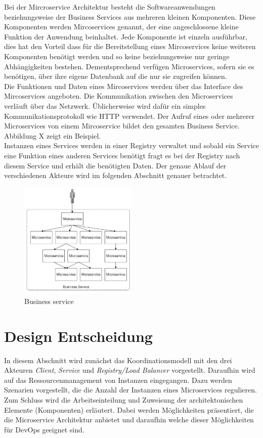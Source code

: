Bei der Mircroservice Architektur besteht die Softwareanwendungen beziehungsweise der Business Services aus mehreren kleinen Komponenten. Diese Komponenten werden Mircoservices genannt, der eine angeschlossene kleine Funktion der Anwendung beinhaltet. Jede Komponente ist einzeln ausführbar, dies hat den Vorteil dass für die Bereitstellung eines Mircoservices keine weiteren Komponenten benötigt werden und so keine beziehungsweise nur geringe Abhängigkeiten bestehen. Dementsprechend verfügen Microservices, sofern sie es benötigen, über ihre eigene Datenbank auf die nur sie zugreifen können. \\
Die Funktionen und Daten eines Mircoservices werden über das Interface des Mircoservices angeboten. Die Kommunikation zwischen den Microservices verläuft über das Netzwerk. Üblicherweise wird dafür ein simples Kommunikationsprotokoll wie HTTP verwendet. Der Aufruf eines oder mehrerer Microservices von einem Mircoservice bildet den gesamten Business Service. Abbildung X zeigt ein Beispiel. \\
Instanzen eines Services werden in einer Registry verwaltet und sobald ein Service eine Funktion eines anderen Services benötigt fragt es bei der Registry nach diesem Service und erhält die benötigten Daten. Der genaue Ablauf der verschiedenen Akteure wird im folgenden Abschnitt genauer betrachtet.\\

\begin{figure}[htbp]
  \centering
  \includegraphics[width=0.5\textwidth]{pictures/businessService.png}
	\caption{Business service}
	\label{bService}
\end{figure}

\section{Design Entscheidung}
In diesem Abschnitt wird zunächst das Koordinationsmodell mit den drei Akteuren \textit{Client}, \textit{Service} und \textit{Registry/Load Balancer} vorgestellt. Daraufhin wird auf das Ressourcenmanagement von Instanzen eingegangen. Dazu werden Szenarien vorgestellt, die die Anzahl der Instanzen eines Microservices regulieren. Zum Schluss wird die Arbeitseinteilung und Zuweisung der architektonischen Elemente (Komponenten) erläutert. Dabei werden Möglichkeiten präsentiert, die die Microservice Architektur anbietet und daraufhin welche dieser Möglichkeiten für DevOps geeignet sind.

